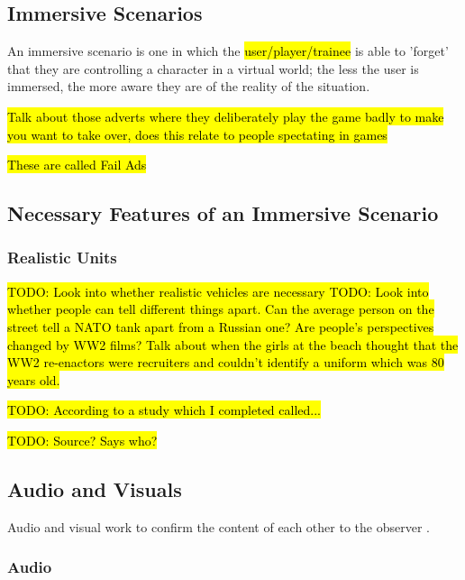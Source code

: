 \documentclass{article}
\begin{document}
\subsection{Immersive Scenarios}

An immersive scenario is one in which the \hl{user/player/trainee} is able to 'forget' that they are controlling a character in a virtual world; the less the user is immersed, the more aware they are of the reality of the situation.

\hl{Talk about those adverts where they deliberately play the game badly to make you want to take over, does this relate to people spectating in games}


\hl{These are called Fail Ads} 

\subsection{Necessary Features of an Immersive Scenario}

\subsubsection{Realistic Units}

\hl{TODO: Look into whether realistic vehicles are necessary
TODO: Look into whether people can tell different things apart. Can the average person on the street tell a NATO tank apart from a Russian one? Are people's perspectives changed by WW2 films? Talk about when the girls at the beach thought that the WW2 re-enactors were recruiters and couldn't identify a uniform which was 80 years old.}

\hl{TODO: According to a study which I completed called... }

\hl{TODO: Source? Says who?}

\subsection{Audio and Visuals}

Audio and visual work to confirm the content of each other to the observer \cite{diegeticSounds1}. 

\subsubsection{Audio}
\end{document}
